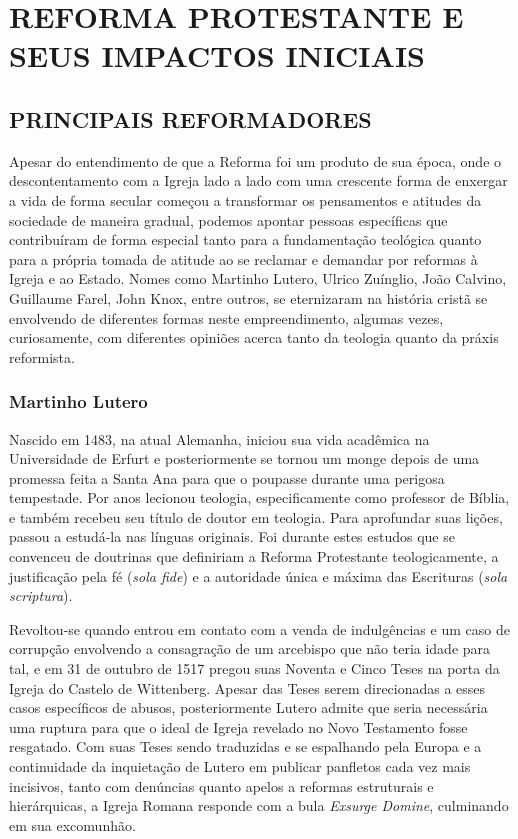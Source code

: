 \documentclass[
    article,            %
	12pt,				%
	oneside,			%
	a4paper,			%
	chapter=TITLE,		%
	section=TITLE,		%
	english,			%
	french,				%
	spanish,			%
	brazil				%
	]{abntex2}
\begin{document}
\section{REFORMA PROTESTANTE E SEUS IMPACTOS INICIAIS}

\subsection{PRINCIPAIS REFORMADORES}
Apesar do entendimento de que a Reforma foi um produto de sua época, onde o descontentamento com a Igreja lado a lado com uma crescente forma de enxergar a vida de forma secular começou a transformar os pensamentos e atitudes da sociedade de maneira gradual, podemos apontar pessoas específicas que contribuíram de forma especial tanto para a fundamentação teológica quanto para a própria tomada de atitude ao se reclamar e demandar por reformas à Igreja e ao Estado. Nomes como Martinho Lutero, Ulrico Zuínglio, João Calvino, Guillaume Farel, John Knox, entre outros, se eternizaram na história cristã se envolvendo de diferentes formas neste empreendimento, algumas vezes, curiosamente, com diferentes opiniões acerca tanto da teologia quanto da práxis reformista.

\subsubsection{Martinho Lutero}
Nascido em 1483, na atual Alemanha, iniciou sua vida acadêmica na Universidade de Erfurt e posteriormente se tornou um monge depois de uma promessa feita a Santa Ana para que o poupasse durante uma perigosa tempestade. Por anos lecionou teologia, especificamente como professor de Bíblia, e também recebeu seu título de doutor em teologia. Para aprofundar suas lições, passou a estudá-la nas línguas originais. Foi durante estes estudos que se convenceu de doutrinas que definiriam a Reforma Protestante teologicamente, a justificação pela fé (\emph{sola fide}) e a autoridade única e máxima das Escrituras (\emph{sola scriptura}).

Revoltou-se quando entrou em contato com a venda de indulgências e um caso de corrupção envolvendo a consagração de um arcebispo que não teria idade para tal, e em 31 de outubro de 1517 pregou suas Noventa e Cinco Teses na porta da Igreja do Castelo de Wittenberg. Apesar das Teses serem direcionadas a esses casos específicos de abusos, posteriormente Lutero admite que seria necessária uma ruptura para que o ideal de Igreja revelado no Novo Testamento fosse resgatado. Com suas Teses sendo traduzidas e se espalhando pela Europa e a continuidade da inquietação de Lutero em publicar panfletos cada vez mais incisivos, tanto com denúncias quanto apelos a reformas estruturais e hierárquicas, a Igreja Romana responde com a bula \emph{Exsurge Domine}, culminando em sua excomunhão.
\end{document}
